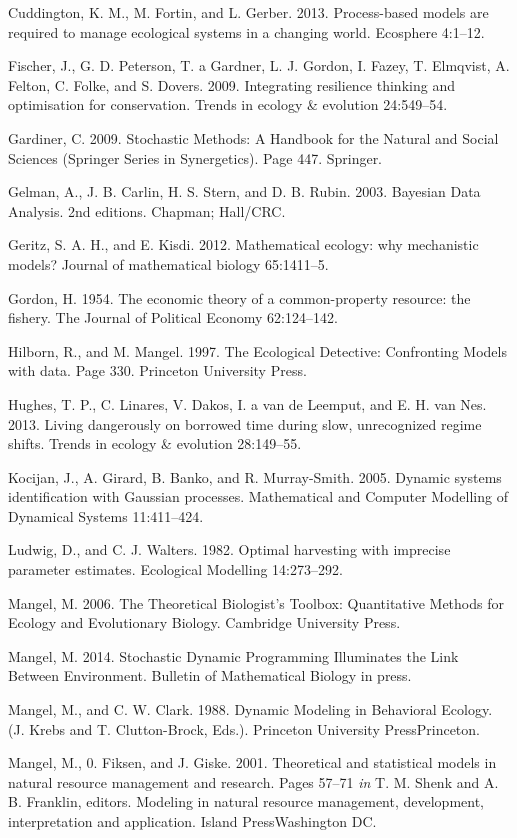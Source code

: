 \documentclass[author-year, 12pt,review]{components/elsarticle} %
\begin{document}
Cuddington, K. M., M. Fortin, and L. Gerber. 2013. Process-based models
are required to manage ecological systems in a changing world. Ecosphere
4:1--12.

Fischer, J., G. D. Peterson, T. a Gardner, L. J. Gordon, I. Fazey, T.
Elmqvist, A. Felton, C. Folke, and S. Dovers. 2009. Integrating
resilience thinking and optimisation for conservation. Trends in ecology
\& evolution 24:549--54.

Gardiner, C. 2009. Stochastic Methods: A Handbook for the Natural and
Social Sciences (Springer Series in Synergetics). Page 447. Springer.

Gelman, A., J. B. Carlin, H. S. Stern, and D. B. Rubin. 2003. Bayesian
Data Analysis. 2nd editions. Chapman; Hall/CRC.

Geritz, S. A. H., and E. Kisdi. 2012. Mathematical ecology: why
mechanistic models? Journal of mathematical biology 65:1411--5.

Gordon, H. 1954. The economic theory of a common-property resource: the
fishery. The Journal of Political Economy 62:124--142.

Hilborn, R., and M. Mangel. 1997. The Ecological Detective: Confronting
Models with data. Page 330. Princeton University Press.

Hughes, T. P., C. Linares, V. Dakos, I. a van de Leemput, and E. H. van
Nes. 2013. Living dangerously on borrowed time during slow, unrecognized
regime shifts. Trends in ecology \& evolution 28:149--55.

Kocijan, J., A. Girard, B. Banko, and R. Murray-Smith. 2005. Dynamic
systems identification with Gaussian processes. Mathematical and
Computer Modelling of Dynamical Systems 11:411--424.

Ludwig, D., and C. J. Walters. 1982. Optimal harvesting with imprecise
parameter estimates. Ecological Modelling 14:273--292.

Mangel, M. 2006. The Theoretical Biologist's Toolbox: Quantitative
Methods for Ecology and Evolutionary Biology. Cambridge University
Press.

Mangel, M. 2014. Stochastic Dynamic Programming Illuminates the Link
Between Environment. Bulletin of Mathematical Biology in press.

Mangel, M., and C. W. Clark. 1988. Dynamic Modeling in Behavioral
Ecology. (J. Krebs and T. Clutton-Brock, Eds.). Princeton University
PressPrinceton.

Mangel, M., 0. Fiksen, and J. Giske. 2001. Theoretical and statistical
models in natural resource management and research. Pages 57--71
\emph{in} T. M. Shenk and A. B. Franklin, editors. Modeling in natural
resource management, development, interpretation and application. Island
PressWashington DC.
\end{document}
